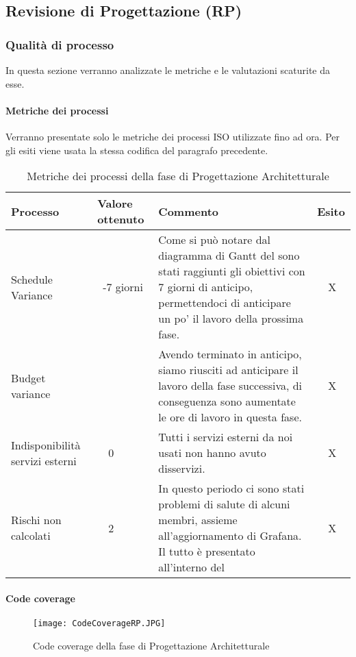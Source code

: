 \subsection{Revisione di Progettazione (RP)}
\subsubsection{Qualità di processo}
In questa sezione verranno analizzate le metriche e le valutazioni scaturite da esse.
\paragraph{Metriche dei processi}
\hspace{10cm}
\newline Verranno presentate solo le metriche dei processi ISO utilizzate fino ad ora.
Per gli esiti viene usata la stessa codifica del paragrafo precedente.
\begin{table}[!htbp]
	\centering
	\renewcommand{\arraystretch}{2} 
	\begin{tabular}{|l|p{2cm}|p{7cm}|l|}
		\rowcolor{orange!50}
		\hline
		\textbf{Processo} & \textbf{Valore ottenuto} & \textbf{Commento} & \textbf{Esito} \\
		\hline
		Schedule Variance & ~-7 giorni & Come si può notare dal diagramma di Gantt del \PdP sono stati raggiunti gli obiettivi con 7 giorni di anticipo, permettendoci di anticipare un po' il lavoro della prossima fase. & ~~X \\
		\hline
		Budget variance & ~~\EUR{ -765} & Avendo terminato in anticipo, siamo riusciti ad anticipare il lavoro della fase successiva, di conseguenza sono aumentate le ore di lavoro in questa fase. &  ~~X \\
		\hline
		{Indisponibilità servizi esterni} & ~~0 & Tutti i servizi esterni da noi usati non hanno avuto disservizi.  & ~~X\\
		\hline
		Rischi non calcolati & ~~2 & In questo periodo ci sono stati problemi di salute di alcuni membri, assieme all'aggiornamento di Grafana. Il tutto è presentato all'interno del \PdP & ~~X\\
		\hline
	\end{tabular}
	\caption{Metriche dei processi della fase di Progettazione Architetturale }
\end{table}
\clearpage
\paragraph{Code coverage}
\hspace{15cm}
\begin{figure}[!htbp]
	\centering
	\texttt{[image: CodeCoverageRP.JPG]}
	\caption{Code coverage della fase di Progettazione Architetturale }
\end{figure}
